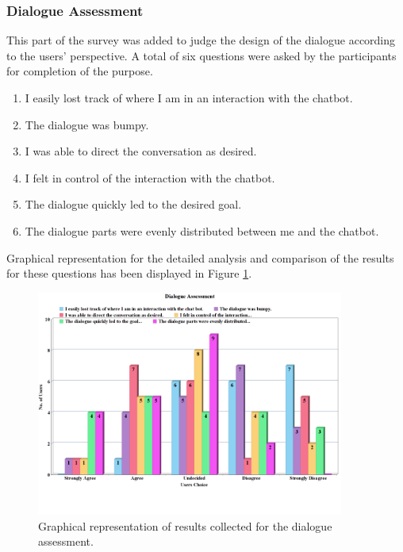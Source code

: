 \subsubsection*{Dialogue Assessment}
This part of the survey was added to judge the design of the dialogue according to the users' perspective. A total of six questions were asked by the participants for completion of the purpose.
\begin{enumerate}
    \item I easily lost track of where I am in an interaction with the chatbot.
    \item The dialogue was bumpy.
    \item I was able to direct the conversation as desired.
    \item I felt in control of the interaction with the chatbot.
    \item The dialogue quickly led to the desired goal.
    \item The dialogue parts were evenly distributed between me and the chatbot.
\end{enumerate}
Graphical representation for the detailed analysis and comparison of the results for these questions has been displayed in Figure \ref{fig:dialogAssess}.

\begin{figure}[!h]
    \centering
    \includegraphics[width=0.9\textwidth]{img/Dialogue_Assessment_Updated_2.png}
    \caption{Graphical representation of results collected for the dialogue assessment.}
    \label{fig:dialogAssess}
\end{figure}

